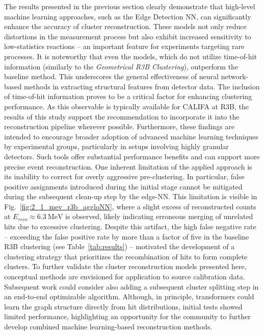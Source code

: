 \documentclass[review,sort&compress]{elsarticle}
\begin{document}
The results presented in the previous section clearly demonstrate that high-level machine learning approaches, such as the Edge Detection NN, can significantly enhance the accuracy of cluster reconstruction. These models not only reduce distortions in the measurement process but also exhibit increased sensitivity to low-statistics reactions -- an important feature for experiments targeting rare processes.\newline
It is noteworthy that even the models, which do not utilize time-of-hit information (similarly to the \textit{Geometrical R3B Clustering}), outperform the baseline method. This underscores the general effectiveness of neural network-based methods in extracting structural features from detector data.\newline
The inclusion of time-of-hit information proves to be a critical factor for enhancing clustering performance. As this observable is typically available for CALIFA at R3B, the results of this study support the recommendation to incorporate it into the reconstruction pipeline wherever possible.\newline
Furthermore, these findings are intended to encourage broader adoption of advanced machine learning techniques by experimental groups, particularly in setups involving highly granular detectors. Such tools offer substantial performance benefits and can support more precise event reconstruction.\newline
One inherent limitation of the applied approach is its inability to correct for overly aggressive pre-clustering. In particular, false positive assignments introduced during the initial stage cannot be mitigated during the subsequent clean-up step by the edge-NN. This limitation is visible in Fig.~\ref{fig:2_1_mev_r3b_aggloNN}, where a slight excess of reconstructed counts at \(E_{reco} \approx 6.3\ \mathrm{MeV}\) is observed, likely indicating erroneous merging of unrelated hits due to excessive clustering. Despite this artifact, the high false negative rate -- exceeding the false positive rate by more than a factor of five in the baseline R3B clustering (see Table~\ref{tab:results}) -- motivated the development of a clustering strategy that prioritizes the recombination of hits to form complete clusters.\newline
To further validate the cluster reconstruction models presented here, conceptual methods are envisioned for application to source calibration data.\newline
Subsequent work could consider also adding a subsequent cluster splitting step in an end-to-end optimizable algorithm. Although, in principle, transformers could learn the graph structure directly from hit distributions, initial tests showed limited performance, highlighting an opportunity for the community to further develop combined machine learning-based reconstruction methods.\newline
\end{document}

